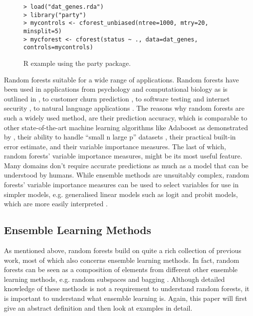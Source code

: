 \documentclass[a4paper,man,12pt,apacite,floatsintext,draftfirst]{apa6} %
\begin{document}
\begin{figure}[H]
\caption{R example using the party package.}
\begin{verbatim}
> load("dat_genes.rda")
> library("party")
> mycontrols <- cforest_unbiased(ntree=1000, mtry=20, minsplit=5)
> mycforest <- cforest(status ~ ., data=dat_genes, controls=mycontrols)
\end{verbatim}
\end{figure}

Random forests suitable for a wide range of applications.
Random forests have been used in applications from psychology and
computational biology as is outlined in ,
to customer churn prediction \cite{xie2009customer},
to software testing \cite{guo2004robust} and internet security
\cite{zhang2005network}, to natural language applications
\cite{xu2004random, kobylinski2008definition}.
The reasons why random forests are such a widely used method,
are their prediction accuracy, which is comparable to other state-of-the-art
machine learning algorithms like Adaboost as demonstrated
by ,
their ability to handle “small n large p” datasets \cite{strobl2009introduction},
their practical built-in error estimate, and their variable importance measures.
The last of which, random forests' variable importance measures,
might be its most useful feature.
Many domains don't require accurate predictions as much as a model that can
be understood by humans.
While ensemble methods are unsuitably complex,
random forests' variable importance measures can be used to select variables
for use in simpler models, e.g.
generalised linear models such as logit and probit models,
which are more easily interpreted \cite{strobl2009introduction}.

\subsection{Ensemble Learning Methods}
As mentioned above, random forests build on quite a rich collection of
previous work, most of which also concerns ensemble learning methods.
In fact, random forests can be seen as a composition of elements from
different other ensemble learning methods, e.g.
random subspaces \cite{ho1998random} and bagging \cite{breiman1996bagging}.
Although detailed knowledge of these methods is not a requirement to
understand random forests, it is important to understand what
ensemble learning is.
Again, this paper will first give an abstract definition and then look at
examples in detail.
\end{document}
